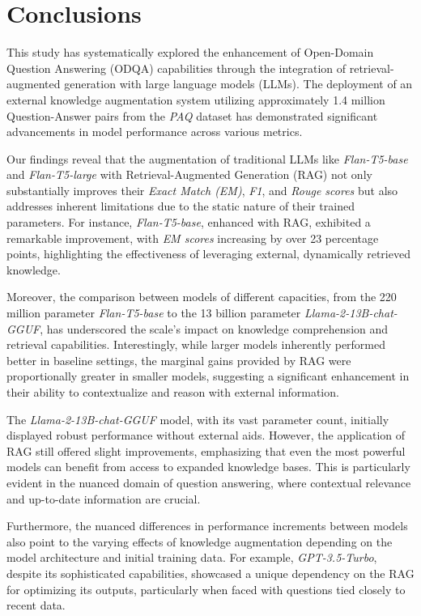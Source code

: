 \section{Conclusions}

This study has systematically explored the enhancement of Open-Domain Question Answering (ODQA) capabilities through the integration of retrieval-augmented generation with large language models (LLMs). The deployment of an external knowledge augmentation system utilizing approximately 1.4 million Question-Answer pairs from the \emph{PAQ} dataset has demonstrated significant advancements in model performance across various metrics.

Our findings reveal that the augmentation of traditional LLMs like \emph{Flan-T5-base} and \emph{Flan-T5-large} with Retrieval-Augmented Generation (RAG) not only substantially improves their \emph{Exact Match (EM)}, \emph{F1}, and \emph{Rouge scores} but also addresses inherent limitations due to the static nature of their trained parameters. For instance, \emph{Flan-T5-base}, enhanced with RAG, exhibited a remarkable improvement, with \emph{EM scores} increasing by over 23 percentage points, highlighting the effectiveness of leveraging external, dynamically retrieved knowledge.

Moreover, the comparison between models of different capacities, from the 220 million parameter \emph{Flan-T5-base} to the 13 billion parameter \emph{Llama-2-13B-chat-GGUF}, has underscored the scale's impact on knowledge comprehension and retrieval capabilities. Interestingly, while larger models inherently performed better in baseline settings, the marginal gains provided by RAG were proportionally greater in smaller models, suggesting a significant enhancement in their ability to contextualize and reason with external information.

The \emph{Llama-2-13B-chat-GGUF} model, with its vast parameter count, initially displayed robust performance without external aids. However, the application of RAG still offered slight improvements, emphasizing that even the most powerful models can benefit from access to expanded knowledge bases. This is particularly evident in the nuanced domain of question answering, where contextual relevance and up-to-date information are crucial.

Furthermore, the nuanced differences in performance increments between models also point to the varying effects of knowledge augmentation depending on the model architecture and initial training data. For example, \emph{GPT-3.5-Turbo}, despite its sophisticated capabilities, showcased a unique dependency on the RAG for optimizing its outputs, particularly when faced with questions tied closely to recent data.

